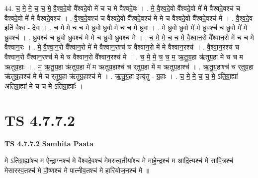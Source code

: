 \documentclass[17pt]{extarticle}
\begin{document}
44. च॒ मे॒ मे॒ च॒ च॒ मे॒ वै॒श्व॒दे॒वो वै᳚श्वदे॒वो मे॑ च च मे वैश्वदे॒वः । . मे॒ वै॒श्व॒दे॒वो वै᳚श्वदे॒वो मे॑ मे वैश्वदे॒वश्च॑ च वैश्वदे॒वो मे॑ मे वैश्वदे॒वश्च॑ । . वै॒श्व॒दे॒वश्च॑ च वैश्वदे॒वो वै᳚श्वदे॒वश्च॑ मे मे च वैश्वदे॒वो वै᳚श्वदे॒वश्च॑ मे । . वै॒श्व॒दे॒व इति॑ वैश्व - दे॒वः । . च॒ मे॒ मे॒ च॒ च॒ मे॒ ध्रु॒वो ध्रु॒वो मे॑ च च मे ध्रु॒वः । . मे॒ ध्रु॒वो ध्रु॒वो मे॑ मे ध्रु॒वश्च॑ च ध्रु॒वो मे॑ मे ध्रु॒वश्च॑ । . ध्रु॒वश्च॑ च ध्रु॒वो ध्रु॒वश्च॑ मे मे च ध्रु॒वो ध्रु॒वश्च॑ मे । . च॒ मे॒ मे॒ च॒ च॒ मे॒ वै॒श्वा॒न॒रो वै᳚श्वान॒रो मे॑ च च मे वैश्वान॒रः । . मे॒ वै॒श्वा॒न॒रो वै᳚श्वान॒रो मे॑ मे वैश्वान॒रश्च॑ च वैश्वान॒रो मे॑ मे वैश्वान॒रश्च॑ । . वै॒श्वा॒न॒रश्च॑ च वैश्वान॒रो वै᳚श्वान॒रश्च॑ मे मे च वैश्वान॒रो वै᳚श्वान॒रश्च॑ मे । . च॒ मे॒ मे॒ च॒ च॒ म॒ ऋ॒तु॒ग्र॒हा ऋ॑तुग्र॒हा मे॑ च च म ऋतुग्र॒हाः । . म॒ ऋ॒तु॒ग्र॒हा ऋ॑तुग्र॒हा मे॑ म ऋतुग्र॒हाश्च॑ च र्‌तुग्र॒हा मे॑ म ऋतुग्र॒हाश्च॑ । . ऋ॒तु॒ग्र॒हाश्च॑ च र्‌तुग्र॒हा ऋ॑तुग्र॒हाश्च॑ मे मे च र्‌तुग्र॒हा ऋ॑तुग्र॒हाश्च॑ मे । . ऋ॒तु॒ग्र॒हा इत्यृ॑तु - ग्र॒हाः । . च॒ मे॒ मे॒ च॒ च॒ मे॒ ऽति॒ग्रा॒ह्या॑ अतिग्रा॒ह्या॑ मे च च मे ऽतिग्रा॒ह्याः᳚ । \newline
\pagebreak
{}

\section{ TS 4.7.7.2 }

\textbf{TS 4.7.7.2 } \newline
\textbf{Samhita Paata} \newline

मे ऽतिग्रा॒ह्या᳚श्च म ऐन्द्रा॒ग्नश्च॑ मे वैश्वदे॒वश्च॑ मेमरुत्व॒तीया᳚श्च मे माहे॒न्द्रश्च॑ म आदि॒त्यश्च॑ मे सावि॒त्रश्च॑ मेसारस्व॒तश्च॑ मे पौ॒ष्णश्च॑ मे पात्नीव॒तश्च॑ मे हारियोज॒नश्च॑ मे ॥ \newline
\end{document}
